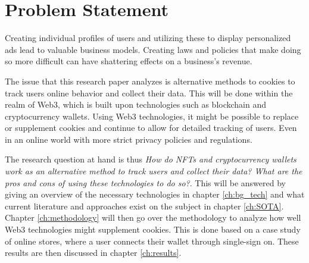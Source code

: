 \chapter{Problem Statement}
\label{ch:problem}

Creating individual profiles of users and utilizing these to display personalized ads lead to valuable business models. Creating laws and policies that make doing so more difficult can have shattering effects on a business's revenue.

The issue that this research paper analyzes is alternative methods to cookies to track users online behavior and collect their data. This will be done within the realm of Web3, which is built upon technologies such as blockchain and cryptocurrency wallets. Using Web3 technologies, it might be possible to replace or supplement cookies and continue to allow for detailed tracking of users. Even in an online world with more strict privacy policies and regulations.

The research question at hand is thus \textit{How do NFTs and cryptocurrency wallets work as an alternative method to track users and collect their data? What are the pros and cons of using these technologies to do so?}. This will be answered by giving an overview of the necessary technologies in chapter \ref{ch:bg_tech} and what current literature and approaches exist on the subject in chapter \ref{ch:SOTA}. Chapter \ref{ch:methodology} will then go over the methodology to analyze how well Web3 technologies might supplement cookies. This is done based on a case study of online stores, where a user connects their wallet through single-sign on. These results are then discussed in chapter \ref{ch:results}.
